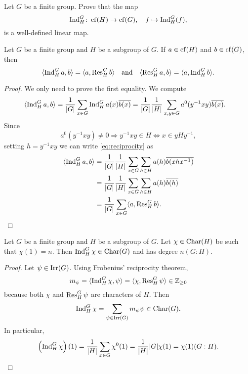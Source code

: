 \begin{exercise}
\label{xca:induction}
    Let $G$ be a finite group. Prove that
    the map 
    \[
    \operatorname{Ind}_H^G\colon\operatorname{cf}(H)\to\operatorname{cf}(G),\quad  f\mapsto\operatorname{Ind}_H^G(f),
    \]
    is a well-defined linear map. 
\end{exercise}

\begin{theorem}
    Let $G$ be a finite group and $H$ be a subgroup of $G$. 
    If $a\in\operatorname{cf}(H)$ and $b\in\operatorname{cf}(G)$, then
    \[
    \langle\operatorname{Ind}_H^Ga,b\rangle=\langle a,\operatorname{Res}_H^Gb\rangle
    \quad\text{and}\quad
    \langle\operatorname{Res}_H^Ga,b\rangle=\langle a,\operatorname{Ind}_H^Gb\rangle.
    \]
\end{theorem}

\begin{proof}
    We only need to prove the first equality. We compute 
    \begin{equation}
    \label{eq:reciprocity}
    \begin{aligned}
        \langle\operatorname{Ind}_H^Ga,b\rangle 
        &= \frac{1}{|G|}\sum_{x\in G}\operatorname{Ind}_H^Ga(x)\overline{b(x)}
        = \frac{1}{|G|}\frac{1}{|H|}\sum_{x,y\in G}a^0(y^{-1}xy)\overline{b(x)}.
    \end{aligned}
    \end{equation}
    Since 
    \[
    a^0(y^{-1}xy)\ne 0\Longrightarrow
    y^{-1}xy\in H\Longleftrightarrow x\in yHy^{-1},
    \]
    setting $h=y^{-1}xy$ 
    we can write \eqref{eq:reciprocity} as 
    \begin{align*}
        \langle\operatorname{Ind}_H^Ga,b\rangle
        &=\frac{1}{|G|}\frac{1}{|H|}\sum_{x\in G}\sum_{h\in H}a(h)\overline{b(xhx^{-1})}\\
        &=\frac{1}{|G|}\frac{1}{|H|}\sum_{x\in G}\sum_{h\in H}a(h)\overline{b(h)}\\
        &=\frac{1}{|G|}\sum_{x\in G}\langle a,\operatorname{Res}_H^Gb\rangle.\qedhere 
    \end{align*}
\end{proof}

\begin{corollary}
\label{cor:reciprocity}
    Let $G$ be a finite group and $H$ be a subgroup of $G$. 
    Let $\chi\in\operatorname{Char}(H)$ be such that 
    $\chi(1)=n$. Then 
    $\operatorname{Ind}_H^G\chi\in\operatorname{Char}(G)$ and 
    has degree $n(G:H)$. 
\end{corollary}

\begin{proof}
    Let $\psi\in\operatorname{Irr}(G)$. Using
    Frobenius' reciprocity theorem, 
    \[
    m_{\psi}=\langle\operatorname{Ind}_H^G\chi,\psi\rangle
    =\langle\chi,\operatorname{Res}_H^G\psi\rangle\in\mathbb{Z}_{\geq0}
    \]
    because both $\chi$ and $\operatorname{Res}_H^G\psi$ are
    characters of $H$. Then 
    \[
    \operatorname{Ind}_H^G\chi=\sum_{\psi\in\operatorname{Irr}(G)}m_{\psi}\psi\in\operatorname{Char}(G).
    \]
    In particular, 
    \[
    \left(\operatorname{Ind}_H^G\chi\right)(1)=\frac{1}{|H|}\sum_{x\in G}\chi^0(1)=\frac{1}{|H|}|G|\chi(1)=\chi(1)(G:H).\qedhere 
    \]
\end{proof}

